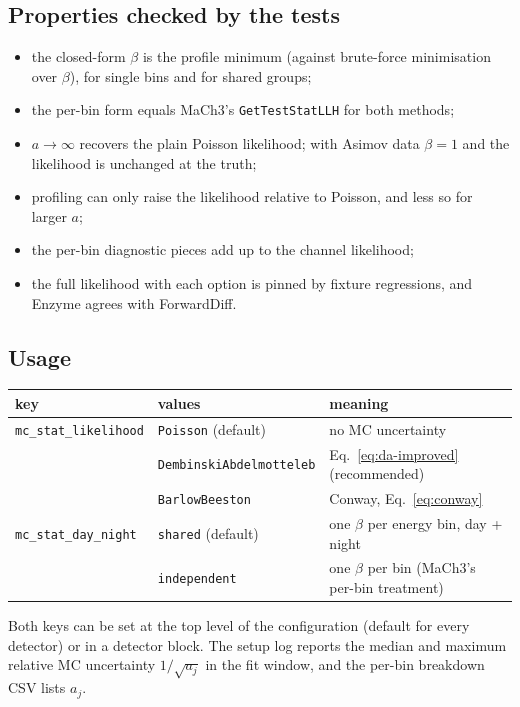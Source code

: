 \documentclass[11pt,a4paper]{article}
\newcommand{\code}[1]{\texttt{#1}}
\begin{document}
\subsection{Properties checked by the tests}

\begin{itemize}
  \item the closed-form $\beta$ is the profile minimum (against brute-force minimisation over
        $\beta$), for single bins and for shared groups;
  \item the per-bin form equals MaCh3's \code{GetTestStatLLH} for both methods;
  \item $a\to\infty$ recovers the plain Poisson likelihood; with Asimov data $\beta=1$ and the
        likelihood is unchanged at the truth;
  \item profiling can only raise the likelihood relative to Poisson, and less so for larger $a$;
  \item the per-bin diagnostic pieces add up to the channel likelihood;
  \item the full likelihood with each option is pinned by fixture regressions, and Enzyme agrees
        with ForwardDiff.
\end{itemize}

\subsection{Usage}

\begin{center}\small
\begin{tabular}{lll}
\toprule
key & values & meaning \\
\midrule
\code{mc\_stat\_likelihood} & \code{Poisson} (default) & no MC uncertainty \\
 & \code{DembinskiAbdelmotteleb} & Eq.~\eqref{eq:da-improved} (recommended) \\
 & \code{BarlowBeeston} & Conway, Eq.~\eqref{eq:conway} \\
\code{mc\_stat\_day\_night} & \code{shared} (default) & one $\beta$ per energy bin, day + night \\
 & \code{independent} & one $\beta$ per bin (MaCh3's per-bin treatment) \\
\bottomrule
\end{tabular}
\end{center}
Both keys can be set at the top level of the configuration (default for every detector) or in a
detector block. The setup log reports the median and maximum relative MC uncertainty
$1/\sqrt{a_j}$ in the fit window, and the per-bin breakdown CSV lists $a_j$.
\end{document}
